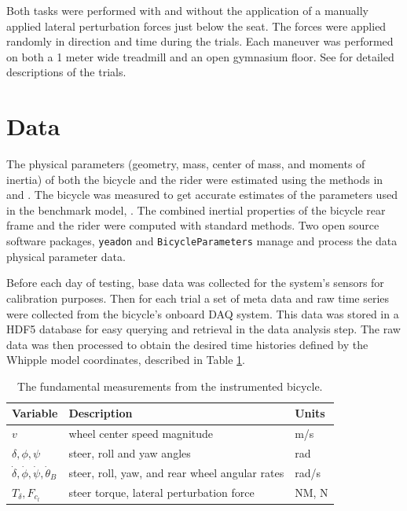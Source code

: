 \documentclass[a4paper]{article}
\begin{document}
Both tasks were performed with and without the application of a manually
applied lateral perturbation forces just below the seat. The forces were
applied randomly in direction and time during the trials. Each maneuver was
performed on both a 1 meter wide treadmill and an open gymnasium floor. See
\cite{Moore2012} for detailed descriptions of the trials.

\section{Data}
\label{sec:data}

The physical parameters (geometry, mass, center of mass, and moments of
inertia) of both the bicycle and the rider were estimated using the methods in
\cite{Moore2012} and \cite{Yeadon1990}. The bicycle was measured to get
accurate estimates of the parameters used in the benchmark model,
\cite{Meijaard2007}. The combined inertial properties of the bicycle rear frame
and the rider were computed with standard methods. Two open source software
packages, \verb|yeadon| \cite{Dembia2011} and \verb|BicycleParameters|
\cite{Moore2011} manage and process the data physical parameter data.

Before each day of testing, base data was collected for the system's sensors
for calibration purposes. Then for each trial a set of meta data and raw time
series were collected from the bicycle's onboard DAQ system. This data was
stored in a HDF5 database for easy querying and retrieval in the data analysis
step. The raw data was then processed to obtain the desired time histories
defined by the Whipple model coordinates, described in Table
\ref{tab:measurements}.

\begin{table}
  \centering
  \caption{The fundamental measurements from the instrumented bicycle.}
  \label{tab:measurements}
  \begin{tabular}{lll}
    \hline
    Variable                                            & Description                                    & Units \\
    \hline
    $v$                                                 & wheel center speed magnitude                   & m/s \\
    $\delta,\phi,\psi$                                  & steer, roll and yaw angles                     & rad \\
    $\dot{\delta},\dot{\phi},\dot{\psi},\dot{\theta}_B$ & steer, roll, yaw, and rear wheel angular rates & rad/s \\
    $T_\delta,F_{c_l}$                                  & steer torque, lateral perturbation force       & NM, N
  \end{tabular}
\end{table}
\end{document}
